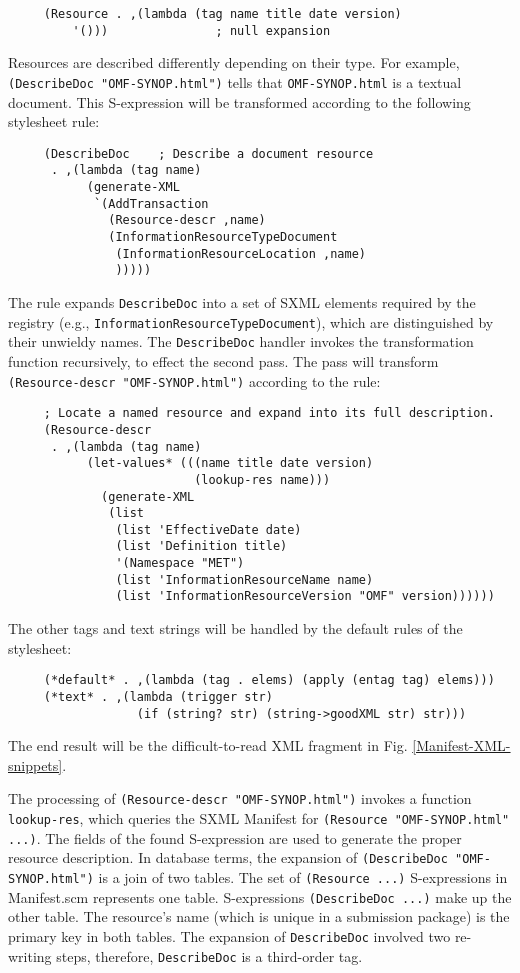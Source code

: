 \documentclass[10pt]{llncs}
\begin{document}
\begin{verbatim}
     (Resource . ,(lambda (tag name title date version)
         '()))               ; null expansion
\end{verbatim}
Resources are described differently depending on their type. 
For example, \texttt{(DescribeDoc "OMF-SYNOP.html")} tells that \texttt{OMF-SYNOP.html} is a textual document. This S-expression will be transformed according to the following stylesheet rule:

\begin{verbatim}
     (DescribeDoc    ; Describe a document resource
      . ,(lambda (tag name)
           (generate-XML
            `(AddTransaction
              (Resource-descr ,name)
              (InformationResourceTypeDocument
               (InformationResourceLocation ,name)
               )))))
\end{verbatim}
The rule expands \texttt{DescribeDoc} into a set of SXML
elements required by the registry (e.g., \texttt{InformationResourceTypeDocument}), which are distinguished by
their unwieldy names. The \texttt{DescribeDoc} handler invokes the
transformation function recursively, to effect the second pass. The
pass will transform \texttt{(Resource-descr "OMF-SYNOP.html")} according to the rule:

\begin{verbatim}
     ; Locate a named resource and expand into its full description.
     (Resource-descr
      . ,(lambda (tag name)
           (let-values* (((name title date version)
                          (lookup-res name)))
             (generate-XML
              (list
               (list 'EffectiveDate date)
               (list 'Definition title)
               '(Namespace "MET")
               (list 'InformationResourceName name)
               (list 'InformationResourceVersion "OMF" version))))))
\end{verbatim}
The other tags and text strings will be handled by the default rules of the stylesheet:

\begin{verbatim}
     (*default* . ,(lambda (tag . elems) (apply (entag tag) elems)))
     (*text* . ,(lambda (trigger str) 
                  (if (string? str) (string->goodXML str) str)))
\end{verbatim}
The end result will be the difficult-to-read XML fragment in Fig. \ref{Manifest-XML-snippets}.

The processing of \texttt{(Resource-descr "OMF-SYNOP.html")} invokes a function \texttt{lookup-res}, which queries the SXML Manifest for \texttt{(Resource "OMF-SYNOP.html" ...)}. The fields of the found
S-expression are used to generate the proper resource description. In
database terms, the expansion of \texttt{(DescribeDoc
"OMF-SYNOP.html")} is a join of two tables.  The set of \texttt{(Resource ...)} S-expressions in Manifest.scm represents one
table. S-expressions \texttt{(DescribeDoc ...)} make up the other
table. The resource's name (which is unique in a submission package)
is the primary key in both tables. The expansion of \texttt{DescribeDoc} involved two re-writing steps, therefore, \texttt{DescribeDoc} is a third-order tag.
\end{document}
